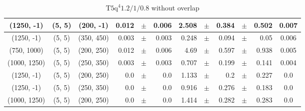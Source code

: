 \documentclass[12pt]{paper}
\newcommand{\TFiveqqqqHM}{\ensuremath{\textrm{T5q}^{4} 1.2/1/0.8}\xspace}
\begin{document}
\begin{table}[ht]
\begin{center}
{\begin{tabular}{|c|c|c|rrr|rrrrr|c|}
(1250, -1)&(5, 5)&(200, -1)&0.012&$\pm$&0.006&2.508&$\pm$&0.384&$\pm$&0.502&0.007\\\hline
(1250, -1)&(5, 5)&(350, 450)&0.003&$\pm$&0.003&0.248&$\pm$&0.094&$\pm$&0.05&0.006\\\hline
(750, 1000)&(5, 5)&(200, 250)&0.012&$\pm$&0.006&4.69&$\pm$&0.597&$\pm$&0.938&0.005\\\hline
(1000, 1250)&(5, 5)&(250, 350)&0.003&$\pm$&0.003&0.707&$\pm$&0.199&$\pm$&0.141&0.004\\\hline
(1250, -1)&(5, 5)&(200, 250)&0.0&$\pm$&0.0&1.133&$\pm$&0.2&$\pm$&0.227&0.0\\\hline
(1250, -1)&(5, 5)&(250, 350)&0.0&$\pm$&0.0&0.916&$\pm$&0.276&$\pm$&0.183&0.0\\\hline
(1000, 1250)&(5, 5)&(200, 250)&0.0&$\pm$&0.0&1.414&$\pm$&0.282&$\pm$&0.283&0.0\\\hline
\end{tabular}}\end{center}\caption{\TFiveqqqqHM without overlap}\end{table}
\end{document}
